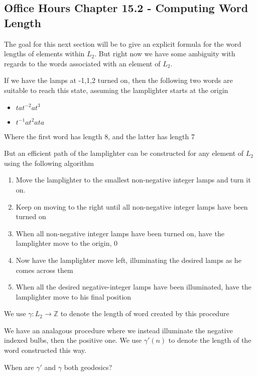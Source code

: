 \subsection{Office Hours Chapter 15.2 - Computing Word Length}
The goal for this next section will be to give an explicit formula for the word lengths of elements within $L_2$. But right now we have some ambiguity with regards to the words associated with an element of $L_2$.
\begin{example}
    If we have the lamps at -1,1,2 turned on, then the following two words are suitable to reach this state, assuming the lamplighter starts at the origin
    \begin{itemize}
        \item $tat^{-2}at^3$
        \item $t^{-1}at^2ata$
    \end{itemize}
    Where the first word has length 8, and the latter has length 7
\end{example}
But an efficient path of the lamplighter can be constructed for any element of $L_2$ using the following algorithm
\begin{definition} %
    \begin{enumerate}
        \item Move the lamplighter to the smallest non-negative integer lamps and turn it on.
        \item Keep on moving to the right until all non-negative integer lamps have been turned on
        \item When all non-negative integer lamps have been turned on, have the lamplighter move to the origin, 0
        \item Now have the lamplighter move left, illuminating the desired lamps as he comes across them
        \item When all the desired negative-integer lamps have been illuminated, have the lamplighter move to his final position
    \end{enumerate}
    We use $\gamma : L_2 \to \mathbb{Z}$ to denote the length of word created by this procedure
\end{definition}
We have an analagous procedure where we instead illuminate the negative indexed bulbs, then the positive one. We use $\gamma'(n)$ to denote the length of the word constructed this way.
\begin{exercise}
    When are $\gamma'$ and $\gamma$ both geodesics?
\end{exercise}
